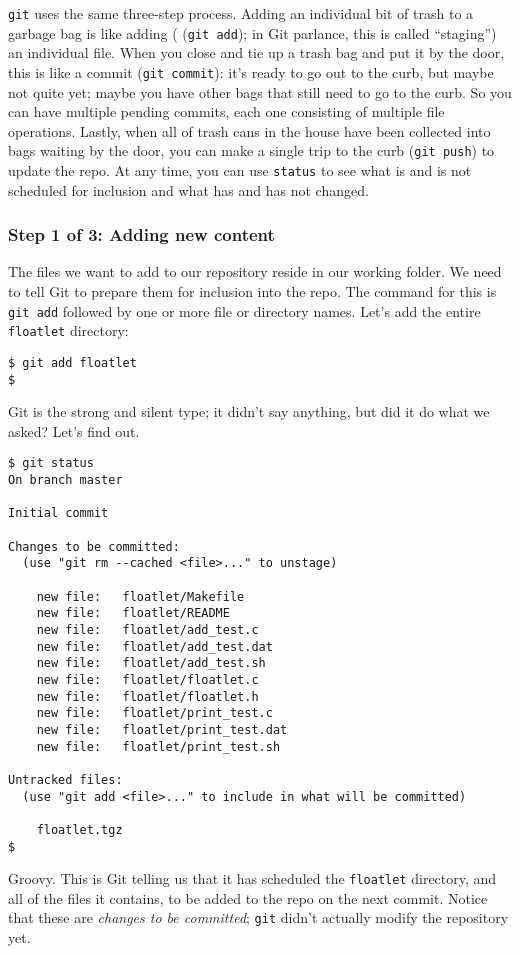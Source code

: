 \documentclass[12pt]{article}
\begin{document}
\verb|git| uses the same three-step process.  Adding an individual bit of trash to a garbage bag is like adding ( (\verb|git add|); in Git parlance, this is called ``staging'') an individual file.  When you close and tie up a trash bag and put it by the door, this is like a commit (\verb|git commit|): it's ready to go out to the curb, but maybe not quite yet; maybe you have other bags that still need to go to the curb.  So you can have multiple pending commits, each one consisting of multiple file operations.  Lastly, when all of trash cans in the house have been collected into bags waiting by the door, you can make a single trip to the curb (\verb|git push|) to update the repo.  At any time, you can use \verb|status| to see what is and is not scheduled for inclusion and what has and has not changed.

\subsubsection{Step 1 of 3: Adding new content}
The files we want to add to our repository reside in our working folder.  We need to tell Git to prepare them for inclusion into the repo.  The command for this is \verb|git add| followed by one or more file or directory names.  Let's add the entire \verb|floatlet| directory:

\begin{verbatim}
$ git add floatlet
$
\end{verbatim}

Git is the strong and silent type; it didn't say anything, but did it do what we asked?  Let's find out.

\begin{verbatim}
$ git status
On branch master

Initial commit

Changes to be committed:
  (use "git rm --cached <file>..." to unstage)

	new file:   floatlet/Makefile
	new file:   floatlet/README
	new file:   floatlet/add_test.c
	new file:   floatlet/add_test.dat
	new file:   floatlet/add_test.sh
	new file:   floatlet/floatlet.c
	new file:   floatlet/floatlet.h
	new file:   floatlet/print_test.c
	new file:   floatlet/print_test.dat
	new file:   floatlet/print_test.sh

Untracked files:
  (use "git add <file>..." to include in what will be committed)

	floatlet.tgz
$
\end{verbatim}
Groovy.  This is Git telling us that it has scheduled the \verb|floatlet| directory, and all of the files it contains, to be added to the repo on the next commit.  Notice that these are \textit{changes to be committed}; \verb|git| didn't actually modify the repository yet.
\end{document}
